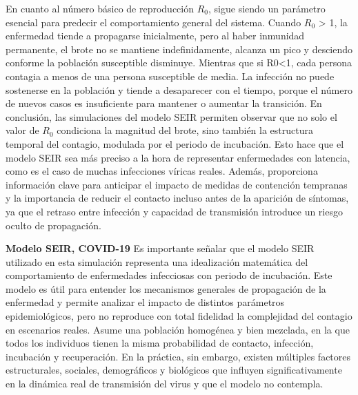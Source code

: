 En cuanto al número básico de reproducción $R_0$, sigue siendo un parámetro esencial para predecir el comportamiento general del sistema. Cuando $R_0$ > 1, la enfermedad tiende a propagarse inicialmente, pero al haber inmunidad permanente, el brote no se mantiene indefinidamente, alcanza un pico y desciendo conforme la población susceptible disminuye. Mientras que si R0<1, cada persona contagia a menos de una persona susceptible de media. La infección no puede sostenerse en la población y tiende a desaparecer con el tiempo, porque el número de nuevos casos es insuficiente para mantener o aumentar la transición.
En conclusión, las simulaciones del modelo SEIR permiten observar que no solo el valor de $R_0$ condiciona la magnitud del brote, sino también la estructura temporal del contagio, modulada por el periodo de incubación. Esto hace que el modelo SEIR sea más preciso a la hora de representar enfermedades con latencia, como es el caso de muchas infecciones víricas reales. Además, proporciona información clave para anticipar el impacto de medidas de contención tempranas y la importancia de reducir el contacto incluso antes de la aparición de síntomas, ya que el retraso entre infección y capacidad de transmisión introduce un riesgo oculto de propagación.

\vspace{2em}
\textbf{Modelo SEIR, COVID-19} Es importante señalar que el modelo SEIR utilizado en esta simulación representa una idealización matemática del comportamiento de enfermedades infecciosas con periodo de incubación. Este modelo es útil para entender los mecanismos generales de propagación de la enfermedad y permite analizar el impacto de distintos parámetros epidemiológicos, pero no reproduce con total fidelidad la complejidad del contagio en escenarios reales.
Asume una población homogénea y bien mezclada, en la que todos los individuos tienen la misma probabilidad de contacto, infección, incubación y recuperación. En la práctica, sin embargo, existen múltiples factores estructurales, sociales, demográficos y biológicos que influyen significativamente en la dinámica real de transmisión del virus y que el modelo no contempla.

